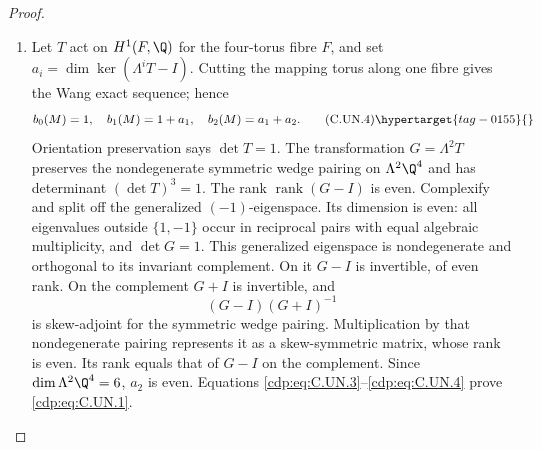 \begin{proof}
\begin{enumerate}[label=\arabic*.,leftmargin=*]
\item Let $T$ act on $H^1(F,\Q)$ for the four-torus fibre $F$, and set
$a_i=\dim\ker(\Lambda^iT-I)$. Cutting the mapping torus along one
fibre gives the Wang exact sequence; hence
\[
 b_0(M)=1,\quad b_1(M)=1+a_1,\quad b_2(M)=a_1+a_2.
                                                        \tag{C.UN.4}\hypertarget{tag-0155}{}\label{cdp:eq:C.UN.4}
\]
Orientation preservation says $\det T=1$. The transformation
$G=\Lambda^2T$ preserves the nondegenerate symmetric wedge pairing
on $\Lambda^2\Q^4$ and has determinant $(\det T)^3=1$.
The rank $\operatorname{rank}(G-I)$ is even. Complexify and split off the generalized
$(-1)$-eigenspace. Its dimension is even: all eigenvalues outside
$\{1,-1\}$ occur in reciprocal pairs with equal algebraic
multiplicity, and $\det G=1$. This generalized eigenspace is
nondegenerate and orthogonal to its invariant complement. On it
$G-I$ is invertible, of even rank. On the complement $G+I$ is
invertible, and
\[
                         (G-I)(G+I)^{-1}
\]
is skew-adjoint for the symmetric wedge pairing. Multiplication by
that nondegenerate pairing represents it as a skew-symmetric matrix,
whose rank is even. Its rank equals that of $G-I$ on the complement.
Since $\dim\Lambda^2\Q^4=6$, $a_2$ is
even. Equations \eqref{cdp:eq:C.UN.3}--\eqref{cdp:eq:C.UN.4} prove \eqref{cdp:eq:C.UN.1}.

\end{enumerate}
\end{proof}